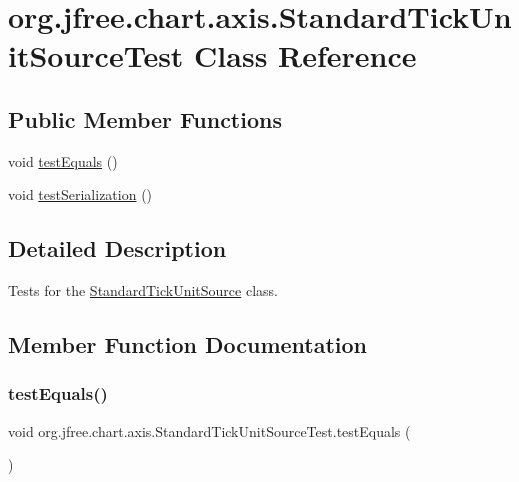 \hypertarget{classorg_1_1jfree_1_1chart_1_1axis_1_1_standard_tick_unit_source_test}{}\section{org.\+jfree.\+chart.\+axis.\+Standard\+Tick\+Unit\+Source\+Test Class Reference}
\label{classorg_1_1jfree_1_1chart_1_1axis_1_1_standard_tick_unit_source_test}
\subsection*{Public Member Functions}
\begin{DoxyCompactItemize}
\item 
void \mbox{\hyperlink{classorg_1_1jfree_1_1chart_1_1axis_1_1_standard_tick_unit_source_test_a87a75dde00bc824417e279c7ef99b8b3}{test\+Equals}} ()
\item 
void \mbox{\hyperlink{classorg_1_1jfree_1_1chart_1_1axis_1_1_standard_tick_unit_source_test_a86e615295f4cbb3faebad7e2a2c09790}{test\+Serialization}} ()
\end{DoxyCompactItemize}


\subsection{Detailed Description}
Tests for the \mbox{\hyperlink{classorg_1_1jfree_1_1chart_1_1axis_1_1_standard_tick_unit_source}{Standard\+Tick\+Unit\+Source}} class. 

\subsection{Member Function Documentation}
\mbox{\label{classorg_1_1jfree_1_1chart_1_1axis_1_1_standard_tick_unit_source_test_a87a75dde00bc824417e279c7ef99b8b3}} 
\subsubsection{\texorpdfstring{test\+Equals()}{testEquals()}}
{\footnotesize\ttfamily void org.\+jfree.\+chart.\+axis.\+Standard\+Tick\+Unit\+Source\+Test.\+test\+Equals (\begin{DoxyParamCaption}{ }\end{DoxyParamCaption})}


